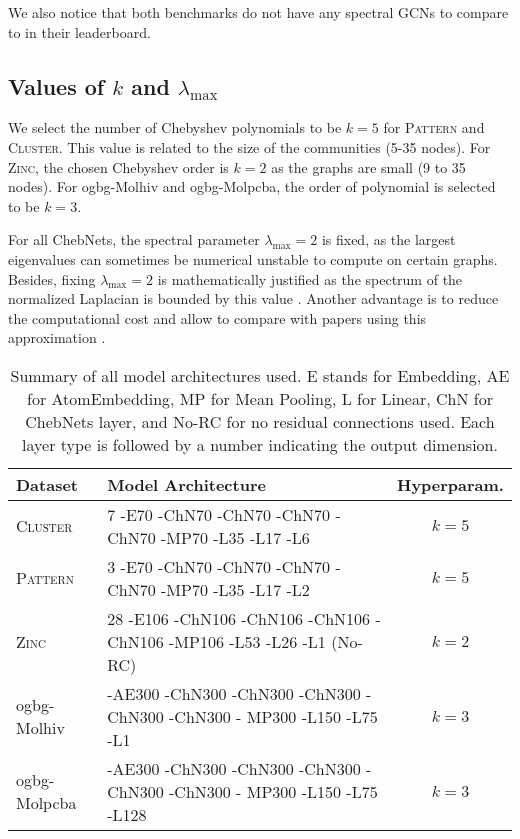\documentclass[letterpaper]{article} \usepackage{aaai21}  \usepackage{times}  \usepackage{helvet} \usepackage{courier}  \usepackage[hyphens]{url}  \usepackage{graphicx} \usepackage{natbib}  \usepackage{caption} \frenchspacing  \setlength{\pdfpagewidth}{8.5in}  \setlength{\pdfpageheight}{11in}
\begin{document}
We also notice that both benchmarks do not have any spectral GCNs to compare to in their leaderboard.


\subsection{Values of $k$ and $\lambda_{\textrm{max}}$}
We select the number of Chebyshev polynomials to be $k=5$ for \textsc{Pattern} and \textsc{Cluster}. This value is related to the size of the communities (5-35 nodes). For \textsc{Zinc}, the chosen Chebyshev order is $k = 2$ as the graphs are small (9 to 35 nodes). For ogbg-Molhiv and ogbg-Molpcba, the order of polynomial is selected to be $k=3$.

For all ChebNets, the spectral parameter $ \lambda_{\textrm{max}} = 2$ is fixed, as the largest eigenvalues can sometimes be numerical unstable to compute on certain graphs. Besides, fixing $ \lambda_{\textrm{max}} = 2$ is mathematically justified as the spectrum of the normalized Laplacian is bounded by this value \cite{chung1997spectral}. Another advantage is to reduce the computational cost and allow to compare with papers using this approximation \cite{knyazev_image_2019, knyazev_spectral_2018}.




\begin{table*}[ht!]
\centering
\begin{tabular}{@{}llc@{}}
\toprule
Dataset           &   Model Architecture                     & Hyperparam.          \\ \midrule
\textsc{Cluster}  & 7 -E70 -ChN70 -ChN70 -ChN70 -ChN70 -MP70 -L35 -L17 -L6 & $k=5$ \\
\textsc{Pattern}  & 3 -E70 -ChN70 -ChN70 -ChN70 -ChN70 -MP70 -L35 -L17 -L2 & $k=5$ \\
\textsc{Zinc}     & 28 -E106 -ChN106 -ChN106 -ChN106 -ChN106 -MP106 -L53 -L26 -L1 (No-RC) & $k=2$\\
ogbg-Molhiv  &   -AE300 -ChN300 -ChN300 -ChN300 -ChN300 -ChN300 - MP300 -L150 -L75 -L1 & $k=3$   \\
ogbg-Molpcba &   -AE300 -ChN300 -ChN300 -ChN300 -ChN300 -ChN300 - MP300 -L150 -L75 -L128 & $k=3$ \\ \bottomrule
\end{tabular}
\caption{Summary of all model architectures used. E stands for Embedding, AE for AtomEmbedding,  MP for Mean Pooling, L for Linear, ChN for ChebNets layer, and No-RC for no residual connections used. Each layer type is followed by a number indicating the output dimension.}
\label{tab:models}
\end{table*}
\end{document}
